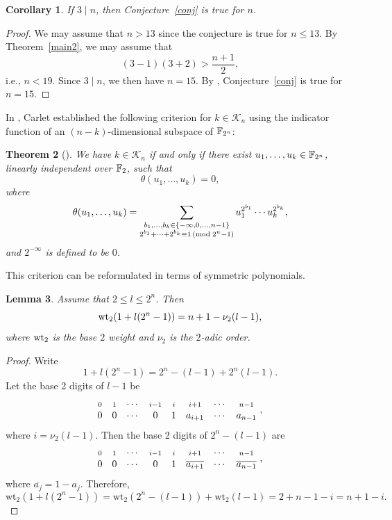 \documentclass{amsart}
\newtheorem{thm}{Theorem}[section]
\newtheorem{lem}[thm]{Lemma}
\newtheorem{cor}[thm]{Corollary}
\numberwithin{equation}{section}
\theoremstyle{definition}
\newcommand{\f}{\Bbb F}
\newcommand{\wt}{\text{wt}}
\begin{document}
\begin{cor}\label{3|n}
If $3\mid n$, then Conjecture~\ref{conj} is true for $n$. 
\end{cor}

\begin{proof}
We may assume that $n>13$ since the conjecture is true for $n\le 13$. By Theorem~\ref{main2}, we may assume that
\[
(3-1)(3+2)>\frac{n+1}2,
\]
i.e., $n<19$. Since $3\mid n$, we then have $n=15$. By \cite[Table~2]{Carlet-Hou}, Conjecture~\ref{conj} is true for $n=15$.
\end{proof}


In \cite{Carlet-pre}, Carlet established the following criterion for $k\in\mathcal K_n$ using the indicator function of an $(n-k)$-dimensional subspace of $\f_{2^n}$:

\begin{thm}[{\cite[\S5.2.4]{Carlet-pre}}]\label{Carlet-criterion}
We have $k\in\mathcal K_n$ if and only if there exist $u_1,\dots,u_k\in\f_{2^n}$, linearly independent over $\f_2$, such that
\[
\theta(u_1,\dots,u_k)=0,
\]
where
\begin{equation}\label{theta}
\theta(u_1,\dots,u_k)=\sum_{\substack{b_1,\dots,b_k\in\{-\infty,0,\dots,n-1\}\cr 2^{b_1}+\cdots+2^{b_k}\equiv 1\,(\text{\rm mod}\;2^n-1)}}u_1^{2^{b_1}}\cdots u_k^{2^{b_k}},
\end{equation}
and $2^{-\infty}$ is defined to be $0$.
\end{thm}

This criterion can be reformulated in terms of symmetric polynomials.

\begin{lem}\label{L2.9}
Assume that $2\le l\le 2^n$. Then
\[
\text{\rm wt}_2(1+l(2^n-1))=n+1-\nu_2(l-1),
\]
where $\text{\rm wt}_2$ is the base $2$ weight and $\nu_2$ is the $2$-adic order.
\end{lem}

\begin{proof}
Write
\[
1+l(2^n-1)=2^n-(l-1)+2^n(l-1).
\]
Let the base 2 digits of $l-1$ be
\[
\begin{matrix}
\scriptstyle 0& \scriptstyle 1& \cdots &\scriptstyle i-1& \scriptstyle i& \scriptstyle i+1& \cdots & \scriptstyle n-1\cr
0&0&\cdots&0&1&a_{i+1}&\cdots&a_{n-1}
\end{matrix}\ ,
\]
where $i=\nu_2(l-1)$. Then the base 2 digits of $2^n-(l-1)$ are 
\[
\begin{matrix}
\scriptstyle 0& \scriptstyle 1& \cdots &\scriptstyle i-1& \scriptstyle i& \scriptstyle i+1& \cdots & \scriptstyle n-1\cr
0&0&\cdots&0&1&\overline{a_{i+1}}&\cdots&\overline{a_{n-1}}
\end{matrix}\ ,
\]
where $\overline{a_j}=1-a_j$. Therefore,
\[
\wt_2(1+l(2^n-1))=\wt_2(2^n-(l-1))+\wt_2(l-1)=2+n-1-i=n+1-i.
\]
\end{proof}
\end{document}
